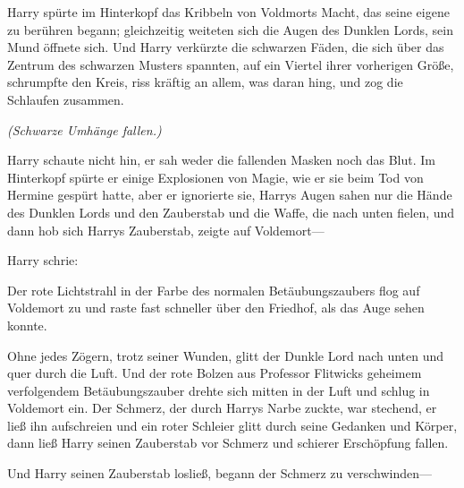 Harry spürte im Hinterkopf das Kribbeln von Voldmorts Macht, das seine eigene zu berühren begann; gleichzeitig weiteten sich die Augen des Dunklen Lords, sein Mund öffnete sich.
Und Harry verkürzte die schwarzen Fäden, die sich über das Zentrum des schwarzen Musters spannten, auf ein Viertel ihrer vorherigen Größe, schrumpfte den Kreis, riss kräftig an allem, was daran hing, und zog die Schlaufen zusammen.

\emph{(Schwarze Umhänge fallen.)}

Harry schaute nicht hin, er sah weder die fallenden Masken noch das Blut. Im Hinterkopf spürte er einige Explosionen von Magie, wie er sie beim Tod von Hermine gespürt hatte, aber er ignorierte sie, Harrys Augen sahen nur die Hände des Dunklen Lords und den Zauberstab und die Waffe, die nach unten fielen, und dann hob sich Harrys Zauberstab, zeigte auf Voldemort—

Harry schrie: 

Der rote Lichtstrahl in der Farbe des normalen Betäubungszaubers flog auf Voldemort zu und raste fast schneller über den Friedhof, als das Auge sehen konnte.

Ohne jedes Zögern, trotz seiner Wunden, glitt der Dunkle Lord nach unten und quer durch die Luft. Und der rote Bolzen aus Professor Flitwicks geheimem verfolgendem Betäubungszauber drehte sich mitten in der Luft und schlug in Voldemort ein.
Der Schmerz, der durch Harrys Narbe zuckte, war stechend, er ließ ihn aufschreien und ein roter Schleier glitt durch seine Gedanken und Körper, dann ließ Harry seinen Zauberstab vor Schmerz und schierer Erschöpfung fallen.

Und Harry seinen Zauberstab losließ, begann der Schmerz zu verschwinden—

